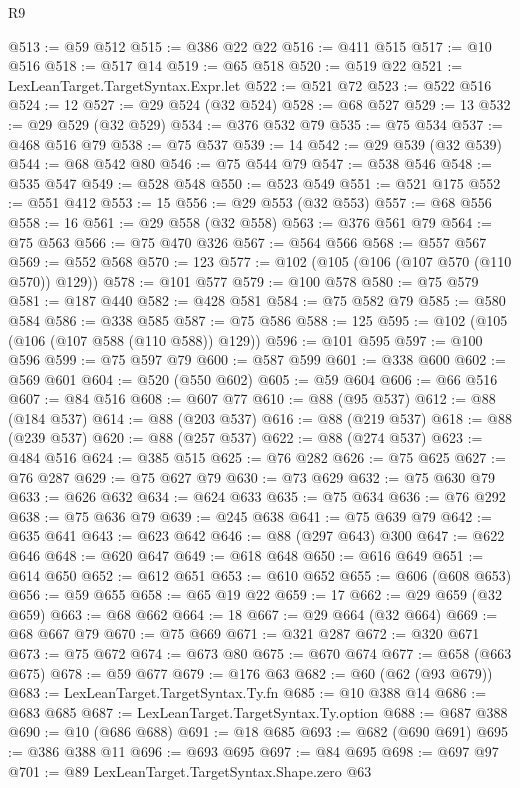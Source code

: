 \begin{lexlean}{R9}
\begin{coremodule}
@513 := @59 @512
@515 := @386 @22 @22
@516 := @411 @515
@517 := @10 @516
@518 := @517 @14
@519 := @65 @518
@520 := @519 @22
@521 := LexLeanTarget.TargetSyntax.Expr.let
@522 := @521 @72
@523 := @522 @516
@524 := 12
@527 := @29 @524 (@32 @524)
@528 := @68 @527
@529 := 13
@532 := @29 @529 (@32 @529)
@534 := @376 @532 @79
@535 := @75 @534
@537 := @468 @516 @79
@538 := @75 @537
@539 := 14
@542 := @29 @539 (@32 @539)
@544 := @68 @542 @80
@546 := @75 @544 @79
@547 := @538 @546
@548 := @535 @547
@549 := @528 @548
@550 := @523 @549
@551 := @521 @175
@552 := @551 @412
@553 := 15
@556 := @29 @553 (@32 @553)
@557 := @68 @556
@558 := 16
@561 := @29 @558 (@32 @558)
@563 := @376 @561 @79
@564 := @75 @563
@566 := @75 @470 @326
@567 := @564 @566
@568 := @557 @567
@569 := @552 @568
@570 := 123
@577 := @102 (@105 (@106 (@107 @570 (@110 @570)) @129))
@578 := @101 @577
@579 := @100 @578
@580 := @75 @579
@581 := @187 @440
@582 := @428 @581
@584 := @75 @582 @79
@585 := @580 @584
@586 := @338 @585
@587 := @75 @586
@588 := 125
@595 := @102 (@105 (@106 (@107 @588 (@110 @588)) @129))
@596 := @101 @595
@597 := @100 @596
@599 := @75 @597 @79
@600 := @587 @599
@601 := @338 @600
@602 := @569 @601
@604 := @520 (@550 @602)
@605 := @59 @604
@606 := @66 @516
@607 := @84 @516
@608 := @607 @77
@610 := @88 (@95 @537)
@612 := @88 (@184 @537)
@614 := @88 (@203 @537)
@616 := @88 (@219 @537)
@618 := @88 (@239 @537)
@620 := @88 (@257 @537)
@622 := @88 (@274 @537)
@623 := @484 @516
@624 := @385 @515
@625 := @76 @282
@626 := @75 @625
@627 := @76 @287
@629 := @75 @627 @79
@630 := @73 @629
@632 := @75 @630 @79
@633 := @626 @632
@634 := @624 @633
@635 := @75 @634
@636 := @76 @292
@638 := @75 @636 @79
@639 := @245 @638
@641 := @75 @639 @79
@642 := @635 @641
@643 := @623 @642
@646 := @88 (@297 @643) @300
@647 := @622 @646
@648 := @620 @647
@649 := @618 @648
@650 := @616 @649
@651 := @614 @650
@652 := @612 @651
@653 := @610 @652
@655 := @606 (@608 @653)
@656 := @59 @655
@658 := @65 @19 @22
@659 := 17
@662 := @29 @659 (@32 @659)
@663 := @68 @662
@664 := 18
@667 := @29 @664 (@32 @664)
@669 := @68 @667 @79
@670 := @75 @669
@671 := @321 @287
@672 := @320 @671
@673 := @75 @672
@674 := @673 @80
@675 := @670 @674
@677 := @658 (@663 @675)
@678 := @59 @677
@679 := @176 @63
@682 := @60 (@62 (@93 @679))
@683 := LexLeanTarget.TargetSyntax.Ty.fn
@685 := @10 @388 @14
@686 := @683 @685
@687 := LexLeanTarget.TargetSyntax.Ty.option
@688 := @687 @388
@690 := @10 (@686 @688)
@691 := @18 @685
@693 := @682 (@690 @691)
@695 := @386 @388 @11
@696 := @693 @695
@697 := @84 @695
@698 := @697 @97
@701 := @89 LexLeanTarget.TargetSyntax.Shape.zero @63

\end{coremodule}
\end{lexlean}
